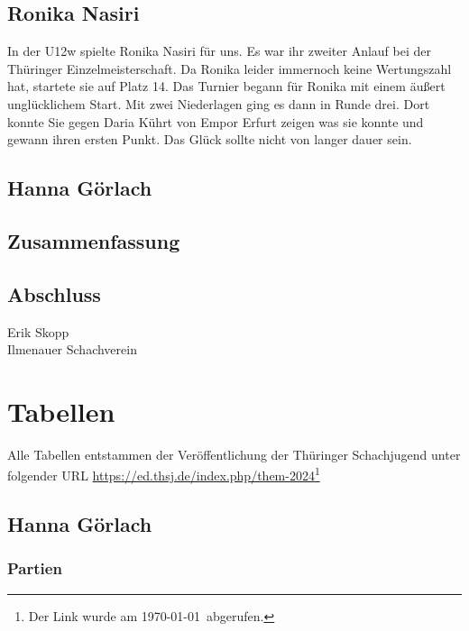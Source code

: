 \documentclass[a4paper,ngerman]{tui-algo-seminar}
\begin{document}
\subsection{Ronika Nasiri}
In der U12w spielte Ronika Nasiri für uns. Es war ihr zweiter Anlauf bei der Thüringer Einzelmeisterschaft. Da Ronika leider immernoch keine Wertungszahl hat, startete sie auf Platz 14. Das Turnier begann für Ronika mit einem äußert unglücklichem Start. Mit zwei Niederlagen ging es dann in Runde drei. Dort konnte Sie gegen Daria Kührt von Empor Erfurt zeigen was sie konnte und gewann ihren ersten Punkt. Das Glück sollte nicht von langer dauer sein.  


\subsection{Hanna Görlach}



\subsection{Zusammenfassung}


\subsection{Abschluss}



\vspace{2cm}
Erik Skopp\\
Ilmenauer Schachverein\\
\clearpage


\section{Tabellen}
Alle Tabellen entstammen der Veröffentlichung der Thüringer Schachjugend unter folgender URL \url{https://ed.thsj.de/index.php/them-2024}\footnote{Der Link wurde am \today ~abgerufen.}

\subsection{Hanna Görlach}
    \subsubsection{Partien}
        
\end{document}
